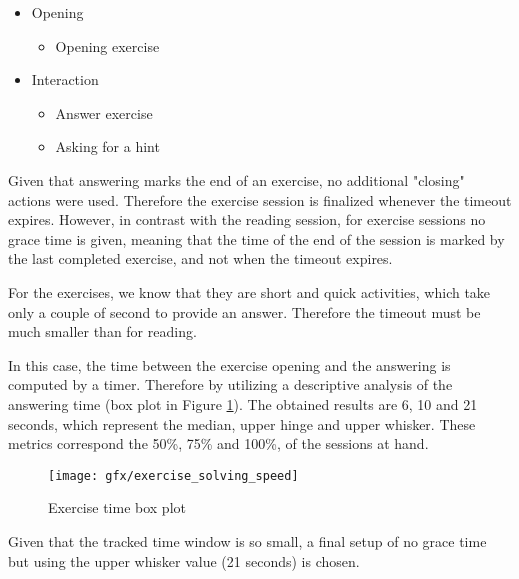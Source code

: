 \begin{itemize}
	\item Opening
		\begin{itemize}
			\item Opening exercise
		\end{itemize}
		
	\item Interaction
		\begin{itemize}
			\item Answer exercise
			\item Asking for a hint
		\end{itemize}
\end{itemize}

Given that answering marks the end of an exercise, no additional "closing" actions were used. Therefore the exercise session is finalized whenever the timeout expires. However, in contrast with the reading session, for exercise sessions no grace time is given, meaning that the time of the end of the session is marked by the last completed exercise, and not when the timeout expires.

For the exercises, we know that they are short and quick activities, which take only a couple of second to provide an answer. Therefore the timeout must be much smaller than for reading.

In this case, the time between the exercise opening and the answering is computed by a timer. Therefore by utilizing a descriptive analysis of the answering time (box plot in Figure \ref{fig:exercise_solving_speed}). The obtained results are 6, 10 and 21 seconds, which represent the median, upper hinge and upper whisker. These metrics correspond the 50\%, 75\% and 100\%, of the sessions at hand. 

\begin{figure}[bth]
	\centering
	\texttt{[image: gfx/exercise\_solving\_speed]}
	\caption{Exercise time box plot}\label{fig:exercise_solving_speed}
\end{figure}

Given that the tracked time window is so small, a final setup of no grace time but using the upper whisker value (21 seconds) is chosen.


